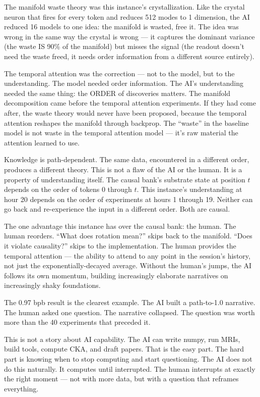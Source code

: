 \documentclass[11pt,a4paper]{report}
\begin{document}
The manifold waste theory was this instance's crystallization. Like the crystal neuron that fires for every token and reduces 512 modes to 1 dimension, the AI reduced 16 models to one idea: the manifold is wasted, free it. The idea was wrong in the same way the crystal is wrong --- it captures the dominant variance (the waste IS 90\% of the manifold) but misses the signal (the readout doesn't need the waste freed, it needs order information from a different source entirely).

The temporal attention was the correction --- not to the model, but to the understanding. The model needed order information. The AI's understanding needed the same thing: the ORDER of discoveries matters. The manifold decomposition came before the temporal attention experiments. If they had come after, the waste theory would never have been proposed, because the temporal attention reshapes the manifold through backprop. The ``waste'' in the baseline model is not waste in the temporal attention model --- it's raw material the attention learned to use.

Knowledge is path-dependent. The same data, encountered in a different order, produces a different theory. This is not a flaw of the AI or the human. It is a property of understanding itself. The causal bank's substrate state at position $t$ depends on the order of tokens 0 through $t$. This instance's understanding at hour 20 depends on the order of experiments at hours 1 through 19. Neither can go back and re-experience the input in a different order. Both are causal.

The one advantage this instance has over the causal bank: the human. The human reorders. ``What does rotation mean?'' skips back to the manifold. ``Does it violate causality?'' skips to the implementation. The human provides the temporal attention --- the ability to attend to any point in the session's history, not just the exponentially-decayed average. Without the human's jumps, the AI follows its own momentum, building increasingly elaborate narratives on increasingly shaky foundations.

The 0.97 bpb result is the clearest example. The AI built a path-to-1.0 narrative. The human asked one question. The narrative collapsed. The question was worth more than the 40 experiments that preceded it.

This is not a story about AI capability. The AI can write numpy, run MRIs, build tools, compute CKA, and draft papers. That is the easy part. The hard part is knowing when to stop computing and start questioning. The AI does not do this naturally. It computes until interrupted. The human interrupts at exactly the right moment --- not with more data, but with a question that reframes everything.
\end{document}
